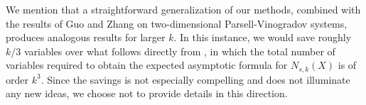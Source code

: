 \documentclass{amsart}%
\numberwithin{equation}{section}
\newtheorem{theorem}{Theorem}[section]
\theoremstyle{remark}
\newcommand{\1}{\mathbbm{1}}
\begin{document}




We mention that a straightforward generalization of our methods, combined with the results of Guo and Zhang \cite{MR3994585} on two-dimensional Parsell-Vinogradov systems, produces analogous results for larger $k$. In this instance, we would save roughly $k/3$ variables over what follows directly from \cite{MR3994585}, in which the total number of variables required to obtain the expected asymptotic formula for $N_{s,k}(X)$ is of order $k^3$. Since the savings is not especially compelling and does not illuminate any new ideas, we choose not to provide details in this direction.

\end{document}
